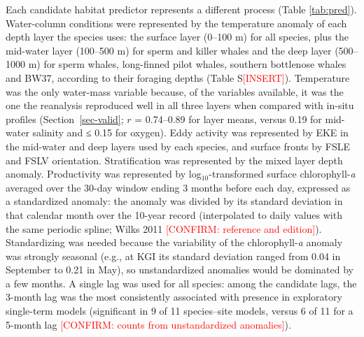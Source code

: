 \documentclass[
  11pt,
]{article}
\newcommand{\ins}[1]{\textcolor{red}{[#1]}}
\newcommand{\conf}[1]{\textcolor{red}{[CONFIRM: #1]}}
\begin{document}
Each candidate habitat predictor represents a different process (Table
\ref{tab:pred}). Water-column conditions were represented by the
temperature anomaly of each depth layer the species uses: the surface
layer (0--100 m) for all species, plus the mid-water layer (100--500 m)
for sperm and killer whales and the deep layer (500--1000 m) for sperm
whales, long-finned pilot whales, southern bottlenose whales and BW37,
according to their foraging depths (Table S\ins{INSERT}). Temperature
was the only water-mass variable because, of the variables available, it
was the one the reanalysis reproduced well in all three layers when
compared with in-situ profiles (Section~\ref{sec-valid}; \(r\) =
0.74--0.89 for layer means, versus 0.19 for mid-water salinity and ≤
0.15 for oxygen). Eddy activity was represented by EKE in the mid-water
and deep layers used by each species, and surface fronts by FSLE and
FSLV orientation. Stratification was represented by the mixed layer
depth anomaly. Productivity was represented by log\(_{10}\)-transformed
surface chlorophyll-\emph{a} averaged over the 30-day window ending 3
months before each day, expressed as a standardized anomaly: the anomaly
was divided by its standard deviation in that calendar month over the
10-year record (interpolated to daily values with the same periodic
spline; Wilks 2011 \conf{reference and edition}). Standardizing was
needed because the variability of the chlorophyll-\emph{a} anomaly was
strongly seasonal (e.g., at KGI its standard deviation ranged from 0.04
in September to 0.21 in May), so unstandardized anomalies would be
dominated by a few months. A single lag was used for all species: among
the candidate lags, the 3-month lag was the most consistently associated
with presence in exploratory single-term models (significant in 9 of 11
species--site models, versus 6 of 11 for a 5-month lag
\conf{counts from unstandardized anomalies}).
\end{document}
